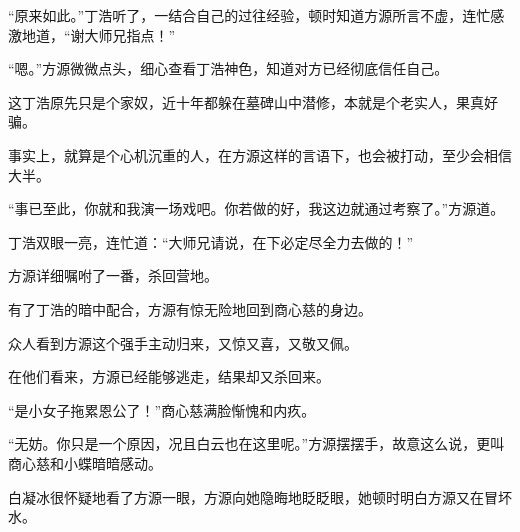 \begin{this_body}
“原来如此。”丁浩听了，一结合自己的过往经验，顿时知道方源所言不虚，连忙感激地道，“谢大师兄指点！”

“嗯。”方源微微点头，细心查看丁浩神色，知道对方已经彻底信任自己。

这丁浩原先只是个家奴，近十年都躲在墓碑山中潜修，本就是个老实人，果真好骗。

事实上，就算是个心机沉重的人，在方源这样的言语下，也会被打动，至少会相信大半。

“事已至此，你就和我演一场戏吧。你若做的好，我这边就通过考察了。”方源道。

丁浩双眼一亮，连忙道：“大师兄请说，在下必定尽全力去做的！”

方源详细嘱咐了一番，杀回营地。

有了丁浩的暗中配合，方源有惊无险地回到商心慈的身边。

众人看到方源这个强手主动归来，又惊又喜，又敬又佩。

在他们看来，方源已经能够逃走，结果却又杀回来。

“是小女子拖累恩公了！”商心慈满脸惭愧和内疚。

“无妨。你只是一个原因，况且白云也在这里呢。”方源摆摆手，故意这么说，更叫商心慈和小蝶暗暗感动。

白凝冰很怀疑地看了方源一眼，方源向她隐晦地眨眨眼，她顿时明白方源又在冒坏水。

\end{this_body}


